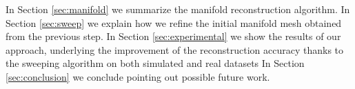 In Section \ref{sec:manifold} we summarize the manifold reconstruction algorithm. 
In Section \ref{sec:sweep} we explain how we refine the initial manifold mesh obtained from the previous step. In Section \ref{sec:experimental} we show the results of our approach, underlying the improvement of the reconstruction accuracy thanks to the sweeping algorithm on both simulated and real datasets In Section \ref{sec:conclusion} we conclude pointing out possible future work.
% 
% 
